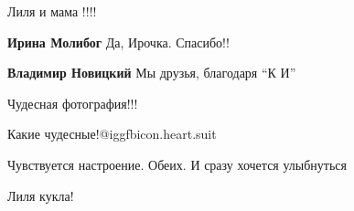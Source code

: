  
 
 
 
 

Лиля и мама !!!!

\textbf{Ирина Молибог} Да, Ирочка. Спасибо!!

\textbf{Владимир Новицкий} Мы друзья, благодаря \enquote{К И}

Чудесная фотография!!!

Какие чудесные!@igg{fbicon.heart.suit}

Чувствуется настроение. Обеих. И сразу хочется улыбнуться

Лиля кукла!
